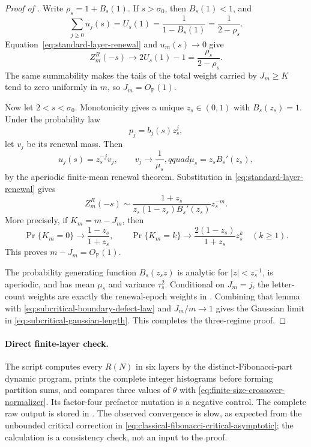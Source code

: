 \begin{proof}[Proof of ]
Write \(\rho_s=1+B_s(1)\).  If \(s>\sigma_0\), then \(B_s(1)<1\), and
\[
 \sum_{j\ge0}u_j(s)=U_s(1)=\frac1{1-B_s(1)}=\frac1{2-\rho_s}.
\]
Equation~\eqref{eq:standard-layer-renewal} and \(u_m(s)\to0\) give
\[
 Z_m^R(-s)\longrightarrow2U_s(1)-1=\frac{\rho_s}{2-\rho_s}.
\]
The same summability makes the tails of the total weight carried by
\(J_m\ge K\) tend to zero uniformly in \(m\), so \(J_m=O_{\mathbb P}(1)\).

Now let \(2<s<\sigma_0\).  Monotonicity gives a unique
\(z_s\in(0,1)\) with \(B_s(z_s)=1\).  Under the probability law
\[
 p_j=b_j(s)z_s^j,
\]
let \(v_j\) be its renewal mass.  Then
\[
 u_j(s)=z_s^{-j}v_j,\qquad
 v_j\longrightarrow\frac1{\mu_s},qquad
 \mu_s=z_sB_s'(z_s),
\]
by the aperiodic finite-mean renewal theorem.  Substitution in
\eqref{eq:standard-layer-renewal} gives
\[
 Z_m^R(-s)\sim
 \frac{1+z_s}{z_s(1-z_s)B_s'(z_s)}z_s^{-m}.
\]
More precisely, if \(K_m=m-J_m\), then
\begin{equation}
 \Pr\{K_m=0\}\longrightarrow\frac{1-z_s}{1+z_s},\qquad
 \Pr\{K_m=k\}\longrightarrow
 \frac{2(1-z_s)}{1+z_s}z_s^k\quad(k\ge1).
 \label{eq:subcritical-boundary-defect-law}
\end{equation}
This proves \(m-J_m=O_{\mathbb P}(1)\).

The probability generating function \(B_s(z_sz)\) is analytic for
\(|z|<z_s^{-1}\), is aperiodic, and has mean \(\mu_s\) and variance
\(\tau_s^2\).  Conditional on \(J_m=j\), the letter-count weights are
exactly the renewal-epoch weights in
.  Combining that lemma with
\eqref{eq:subcritical-boundary-defect-law} and \(J_m/m\to1\) gives the
Gaussian limit in \eqref{eq:subcritical-gaussian-length}.  This completes
the three-regime proof.
\end{proof}

\paragraph{Direct finite-layer check.}
The script  computes
every \(R(N)\) in six layers by the distinct-Fibonacci-part dynamic program,
prints the complete integer histograms before forming partition sums, and
compares three values of \(\theta\) with
\eqref{eq:finite-size-crossover-normalizer}.  Its factor-four prefactor
mutation is a negative control.  The complete raw output is stored in
.  The observed
convergence is slow, as expected from the unbounded critical correction in
\eqref{eq:classical-fibonacci-critical-asymptotic}; the calculation is a
consistency check, not an input to the proof.

